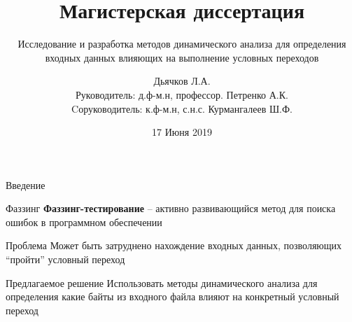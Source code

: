 \documentclass[10pt]{beamer}
\title{Магистерская диссертация}
\subtitle{Исследование и разработка методов динамического анализа для определения входных данных влияющих на выполнение условных переходов}
\author{Дьячков Л.А.\\[3mm]{\small Руководитель: д.ф-м.н, профессор. Петренко А.К.}\\[1mm]
{\small Cоруководитель: к.ф-м.н, с.н.с. Курмангалеев Ш.Ф.}\\[3mm]
}
\institute{ИСП РАН}
\date{17 Июня 2019}
\begin{document}
\maketitle

\begin{frame}{Введение}
  \begin{block}{Фаззинг}
  \textbf{Фаззинг-тестирование} -- активно развивающийся метод для поиска ошибок в программном обеспечении %
  \end{block}
  \pause
  \begin{block}{Проблема}
  Может быть затруднено нахождение входных данных, позволяющих ``пройти'' условный переход
  \end{block}
  \pause
  \begin{block}{Предлагаемое решение}
    Использовать методы динамического анализа для определения какие байты из входного файла влияют на конкретный условный переход
  \end{block}
\end{frame}
\end{document}
